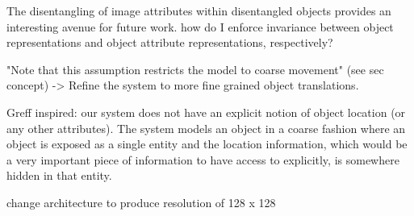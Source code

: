 \documentclass[12pt,a4paper]{article}
\begin{document}
\par The disentangling of image attributes within disentangled objects provides an interesting avenue for future work. how do I enforce invariance between object representations and object attribute representations, respectively?

\par "Note that this assumption restricts the model to coarse movement" (see sec concept) -> Refine the system to more fine grained object translations.

\par Greff inspired: our system does not have an explicit notion of object location (or any other attributes). The system models an object in a coarse fashion where an object is exposed as a single entity and the location information, which would be a very important piece of information to have access to explicitly, is somewhere hidden in that entity.

\par change architecture to produce resolution of 128 x 128


\printbibliography
\end{document}
